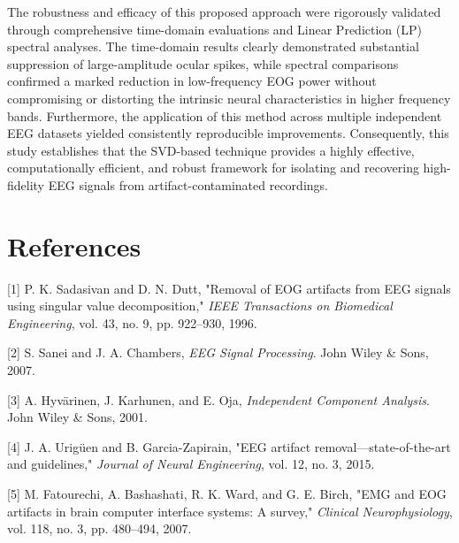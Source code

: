 \documentclass[17pt,a4paper]{extarticle}
\begin{document}
The robustness and efficacy of this proposed approach were rigorously validated
through comprehensive time-domain evaluations and Linear Prediction (LP) spectral
analyses. The time-domain results clearly demonstrated substantial suppression of
large-amplitude ocular spikes, while spectral comparisons confirmed a marked
reduction in low-frequency EOG power without compromising or distorting the
intrinsic neural characteristics in higher frequency bands. Furthermore, the
application of this method across multiple independent EEG datasets yielded
consistently reproducible improvements. Consequently, this study establishes that
the SVD-based technique provides a highly effective, computationally efficient, and
robust framework for isolating and recovering high-fidelity EEG signals from
artifact-contaminated recordings.

\section*{References}

[1] P. K. Sadasivan and D. N. Dutt, "Removal of EOG artifacts from EEG signals using
singular value decomposition," \textit{IEEE Transactions on Biomedical Engineering}, vol. 43,
no. 9, pp. 922--930, 1996.

[2] S. Sanei and J. A. Chambers, \textit{EEG Signal Processing}. John Wiley \& Sons, 2007.

[3] A. Hyvärinen, J. Karhunen, and E. Oja, \textit{Independent Component Analysis}. John
Wiley \& Sons, 2001.

[4] J. A. Urigüen and B. Garcia-Zapirain, "EEG artifact removal---state-of-the-art and
guidelines," \textit{Journal of Neural Engineering}, vol. 12, no. 3, 2015.

[5] M. Fatourechi, A. Bashashati, R. K. Ward, and G. E. Birch, "EMG and EOG artifacts
in brain computer interface systems: A survey," \textit{Clinical Neurophysiology}, vol. 118, no.
3, pp. 480--494, 2007.
\end{document}
